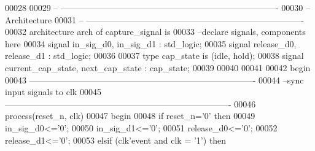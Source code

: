 \begin{DoxyCode}
00028 
00029 \textcolor{keyword}{-- ----------------------------------------------------------------------------}
00030 \textcolor{keyword}{-- Architecture}
00031 \textcolor{keyword}{-- ----------------------------------------------------------------------------}
00032 \textcolor{keywordflow}{architecture} arch \textcolor{keywordflow}{of} capture_signal is
00033 \textcolor{keyword}{--declare signals,  components here}
00034 \textcolor{keywordflow}{signal} \textcolor{vhdlchar}{in\_sig\_d0}\textcolor{vhdlchar}{,} \textcolor{vhdlchar}{in\_sig\_d1}     \textcolor{vhdlchar}{:} \textcolor{comment}{std\_logic};
00035 \textcolor{keywordflow}{signal} \textcolor{vhdlchar}{release\_d0}\textcolor{vhdlchar}{,} \textcolor{vhdlchar}{release\_d1}   \textcolor{vhdlchar}{:} \textcolor{comment}{std\_logic};
00036 
00037   \textcolor{keywordflow}{type} \textcolor{vhdlchar}{cap\_state} \textcolor{keywordflow}{is} \textcolor{vhdlchar}{(}\textcolor{vhdlchar}{idle}\textcolor{vhdlchar}{,} \textcolor{vhdlchar}{hold}\textcolor{vhdlchar}{)};
00038   \textcolor{keywordflow}{signal} \textcolor{vhdlchar}{current\_cap\_state}\textcolor{vhdlchar}{,} \textcolor{vhdlchar}{next\_cap\_state} \textcolor{vhdlchar}{:}  \textcolor{vhdlchar}{cap\_state};
00039 
00040 
00041   
00042 \textcolor{vhdlkeyword}{begin}
00043 \textcolor{keyword}{-------------------------------------------------------------------------------}
00044 \textcolor{keyword}{--sync input signals to clk}
00045 \textcolor{keyword}{-------------------------------------------------------------------------------}
00046   \textcolor{keywordflow}{process}(reset\_n, clk)
00047 \textcolor{vhdlkeyword}{    begin}
00048       \textcolor{keywordflow}{if} \textcolor{vhdlchar}{reset\_n}\textcolor{vhdlchar}{=}\textcolor{vhdlchar}{'}\textcolor{vhdllogic}{}\textcolor{vhdllogic}{0}\textcolor{vhdlchar}{'} \textcolor{keywordflow}{then}
00049         \textcolor{vhdlchar}{in\_sig\_d0}\textcolor{vhdlchar}{<=}\textcolor{vhdlchar}{'}\textcolor{vhdllogic}{}\textcolor{vhdllogic}{0}\textcolor{vhdlchar}{'};
00050           \textcolor{vhdlchar}{in\_sig\_d1}\textcolor{vhdlchar}{<=}\textcolor{vhdlchar}{'}\textcolor{vhdllogic}{}\textcolor{vhdllogic}{0}\textcolor{vhdlchar}{'};
00051           \textcolor{vhdlchar}{release\_d0}\textcolor{vhdlchar}{<=}\textcolor{vhdlchar}{'}\textcolor{vhdllogic}{}\textcolor{vhdllogic}{0}\textcolor{vhdlchar}{'};
00052           \textcolor{vhdlchar}{release\_d1}\textcolor{vhdlchar}{<=}\textcolor{vhdlchar}{'}\textcolor{vhdllogic}{}\textcolor{vhdllogic}{0}\textcolor{vhdlchar}{'};
00053         \textcolor{keywordflow}{elsif} \textcolor{vhdlchar}{(}\textcolor{vhdlchar}{clk}\textcolor{vhdlchar}{'}\textcolor{vhdlkeyword}{event} \textcolor{keywordflow}{and} \textcolor{vhdlchar}{clk} \textcolor{vhdlchar}{=} \textcolor{vhdlchar}{'}\textcolor{vhdllogic}{}\textcolor{vhdllogic}{1}\textcolor{vhdlchar}{'}\textcolor{vhdlchar}{)} \textcolor{keywordflow}{then}

\end{DoxyCode}
